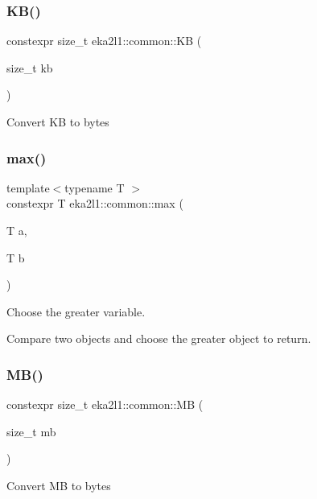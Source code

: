 \subsubsection{\texorpdfstring{K\+B()}{KB()}}
{\footnotesize\ttfamily constexpr size\+\_\+t eka2l1\+::common\+::\+KB (\begin{DoxyParamCaption}\item[{size\+\_\+t}]{kb }\end{DoxyParamCaption})}

Convert KB to bytes \mbox{\label{namespaceeka2l1_1_1common_a43af9f272265cfb2ecad3ec902d1ab4e}} 
\subsubsection{\texorpdfstring{max()}{max()}}
{\footnotesize\ttfamily template$<$typename T $>$ \\
constexpr T eka2l1\+::common\+::max (\begin{DoxyParamCaption}\item[{T}]{a,  }\item[{T}]{b }\end{DoxyParamCaption})}



Choose the greater variable. 

Compare two objects and choose the greater object to return. \mbox{\label{namespaceeka2l1_1_1common_aeb726f22c3441e71f033bdc4114807f9}} 
\subsubsection{\texorpdfstring{M\+B()}{MB()}}
{\footnotesize\ttfamily constexpr size\+\_\+t eka2l1\+::common\+::\+MB (\begin{DoxyParamCaption}\item[{size\+\_\+t}]{mb }\end{DoxyParamCaption})}

Convert MB to bytes \mbox{\label{namespaceeka2l1_1_1common_a8da53deb444a8bd214227b4098564855}} 
